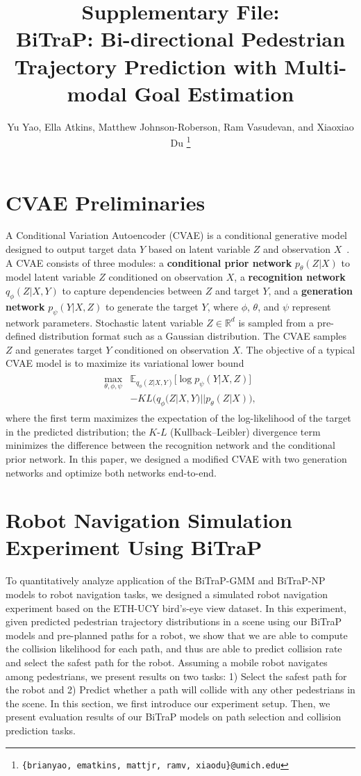 \documentclass[letterpaper, 10 pt, conference]{ieeeconf}
\title{\Large \bf
Supplementary File: \\
\large BiTraP: Bi-directional Pedestrian Trajectory Prediction with Multi-modal Goal Estimation}
\author{Yu Yao, Ella Atkins, Matthew Johnson-Roberson, Ram Vasudevan, and Xiaoxiao Du
\thanks{\tt\scriptsize *\{brianyao, ematkins, mattjr, ramv, xiaodu\}@umich.edu}
}
\begin{document}
\maketitle
\section{CVAE Preliminaries}
A Conditional Variation Autoencoder (CVAE) is a conditional generative model designed to output target data $Y$ based on latent variable $Z$ and observation $X$~\cite{sohn2015learning}. A CVAE consists of three modules: a \textbf{conditional prior network} $p_\theta(Z|X)$ to model latent variable $Z$ conditioned on observation $X$, a \textbf{recognition network} $q_\phi(Z|X, Y)$ to capture dependencies between $Z$ and target $Y$, and a \textbf{generation network} $p_\psi(Y|X, Z)$ to generate the target $Y$, where $\phi$, $\theta$, and $\psi$ represent network parameters. Stochastic latent variable $Z\in\mathbb{R}^d$ is sampled from a pre-defined distribution format such as a Gaussian distribution. The CVAE samples $Z$ and generates target $Y$ conditioned on observation $X$. The objective of a typical CVAE model is to maximize its variational lower bound
\begin{align}
\begin{split}
\label{eq:vlb}
    \max_{\theta,\phi,\psi}  &\mathbb{E}_{
    q_\phi(Z|X,Y)}
    \Big[
        \log{p_\psi(Y|X,Z)}
    \Big]\\
    &-KL\Big(q_\phi(Z|X,Y)||p_\theta(Z|X)\Big),
    \end{split}
\end{align}
where the first term maximizes the expectation of the log-likelihood 
of the target in the predicted distribution; 
the $K$-$L$ (Kullback–Leibler) divergence term minimizes the difference 
between the recognition network and the conditional prior network. In this paper, we designed a modified CVAE with two generation networks and optimize both networks end-to-end.

\section{Robot Navigation Simulation Experiment Using BiTraP}

To quantitatively analyze application of the BiTraP-GMM and BiTraP-NP models to robot navigation tasks, we designed a simulated robot navigation
experiment based on the ETH-UCY bird's-eye view dataset. In this experiment, given  predicted pedestrian trajectory distributions in a scene using our BiTraP models and pre-planned paths for a robot, we show that we are able to compute the collision likelihood for each path, and thus are able to predict collision rate and select the safest path for the robot. Assuming a mobile robot navigates among pedestrians, we present results on two tasks: 1) Select the safest path for the robot and 2) Predict whether a path will collide with any other pedestrians in the scene. In this section, we first introduce our experiment setup. Then, we present evaluation results of our BiTraP models on path selection and collision prediction tasks.
\end{document}
